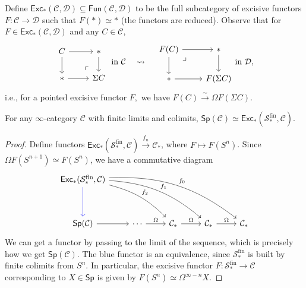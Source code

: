 Define $\mathsf{Exc} _*(\mathcal{C} ,\mathcal{D} ) \subseteq \mathsf{Fun} (\mathcal{C} ,\mathcal{D} )$ to be the full subcategory of excisive functors $F \colon \mathcal{C}  \to \mathcal{D} $ such that $F(*) \simeq  *$ (the functors are reduced). Observe that for $F \in \mathsf{Exc} _* (\mathcal{C} ,\mathcal{D} )$ and any $C \in \mathcal{C}  $, \[
\begin{tikzcd}
    C \arrow[r]\arrow[d] & * \arrow[d]\\
    *\arrow[r] & \Sigma C\arrow[ul,phantom,"\ulcorner", very near start]
\end{tikzcd}\ \text{in} \ \mathcal C \quad \leadsto\quad 
\begin{tikzcd}
    F(C) \arrow[r]\arrow[dr,phantom,"\lrcorner",very near start]\arrow[d] &*\arrow[d] \\
    * \arrow[r] & F(\Sigma C)
\end{tikzcd} \text{in} \ \mathcal{D},
\] i.e., for a pointed excisive functor $F,$ we have $F(C) \xrightarrow{\sim} \Omega F(\Sigma C)$.

\begin{prop}
    For any $\infty$-category $\mathcal{C} $ with finite limits and colimits, $\mathsf{Sp} (\mathcal{C} ) \simeq  \mathsf{Exc} _* (\mathcal{S} _* ^{\mathrm{fin}}, \mathcal{C} )$.
\end{prop}
\begin{proof}
    Define functors $\mathsf{Exc} _* (\mathcal{S} ^{\mathrm{fin}}_*, \mathcal{C} ) \xrightarrow{f_n } \mathcal{C} _*$, where $F \mapsto F(S^n )$. Since $\Omega F(S^{n+1}) \simeq F (S^n )$, we have a commutative diagram \[
        \begin{tikzcd}
{\mathsf{Exc}_*(\mathcal S_*^{\mathrm{fin}},\mathcal C)} \arrow[dd,blue] \arrow[rrdd, "f_2", bend left=15] \arrow[rrrdd, "f_1", bend left=18] \arrow[rrrrdd,"f_0", bend left=20] &                            &                                  &                                  &              \\
                                                                                                                                               &                            &                                  &                                  &              \\
\mathsf{Sp}(\mathcal C) \arrow[r]                                                                                                              & \cdots \arrow[r, "\Omega"] & \mathcal C_* \arrow[r, "\Omega"] & \mathcal C_* \arrow[r, "\Omega"] & \mathcal C_*
\end{tikzcd}
    \] We can get a functor by passing to the limit of the sequence, which is precisely how we get $\mathsf{Sp} (\mathcal{C} )$. The blue functor is an equivalence, since $\mathcal{S} _* ^{\mathrm{fin}}$ is built by finite colimits from $S^n $. In particular, the excisive functor $F \colon \mathcal{S} _* ^{\mathrm{fin}} \to \mathcal{C} $ corresponding to $X \in \mathsf{Sp} $ is given by $F(S^n ) \simeq  \Omega ^{\infty-n}X$.
\end{proof}

